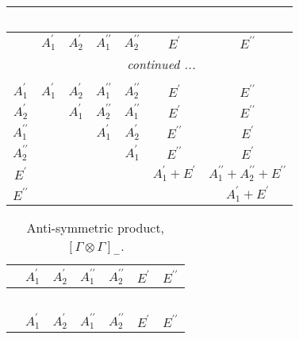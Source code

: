 \documentclass[fleqn,10pt,landscape]{article}
\begin{document}
\begin{itemize}
\begin{center}
\begin{longtable}{c|cccccc}
\multicolumn{6}{l}{\tablename\ \thetable{}} \\
 \hline \hline
 & $ A_{1}^{\prime} $ & $ A_{2}^{\prime} $ & $ A_{1}^{\prime\prime} $ & $ A_{2}^{\prime\prime} $ & $ E^{\prime} $ & $ E^{\prime\prime} $ \\ \hline \endhead

 \hline \hline
\multicolumn{6}{r}{\footnotesize\it continued ...} \\ \endfoot

 \hline \hline
\multicolumn{6}{r}{} \\ \endlastfoot

$ A_{1}^{\prime} $ & $ A_{1}^{\prime} $ & $ A_{2}^{\prime} $ & $ A_{1}^{\prime\prime} $ & $ A_{2}^{\prime\prime} $ & $ E^{\prime} $ & $ E^{\prime\prime} $ \\
$ A_{2}^{\prime} $ & $  $ & $ A_{1}^{\prime} $ & $ A_{2}^{\prime\prime} $ & $ A_{1}^{\prime\prime} $ & $ E^{\prime} $ & $ E^{\prime\prime} $ \\
$ A_{1}^{\prime\prime} $ & $  $ & $  $ & $ A_{1}^{\prime} $ & $ A_{2}^{\prime} $ & $ E^{\prime\prime} $ & $ E^{\prime} $ \\
$ A_{2}^{\prime\prime} $ & $  $ & $  $ & $  $ & $ A_{1}^{\prime} $ & $ E^{\prime\prime} $ & $ E^{\prime} $ \\
$ E^{\prime} $ & $  $ & $  $ & $  $ & $  $ & $ A_{1}^{\prime} + E^{\prime} $ & $ A_{1}^{\prime\prime} + A_{2}^{\prime\prime} + E^{\prime\prime} $ \\
$ E^{\prime\prime} $ & $  $ & $  $ & $  $ & $  $ & $  $ & $ A_{1}^{\prime} + E^{\prime} $ \\
\end{longtable}
\end{center}
\begin{center}
\renewcommand{\arraystretch}{1.0}
\begin{longtable}{ccccccc}
\caption{Anti-symmetric product, $[\Gamma\otimes\Gamma]_-$.}
 \\
 \hline \hline
 & $ A_{1}^{\prime} $ & $ A_{2}^{\prime} $ & $ A_{1}^{\prime\prime} $ & $ A_{2}^{\prime\prime} $ & $ E^{\prime} $ & $ E^{\prime\prime} $ \\ \hline \endfirsthead

\multicolumn{6}{l}{\tablename\ \thetable{}} \\
 \hline \hline
 & $ A_{1}^{\prime} $ & $ A_{2}^{\prime} $ & $ A_{1}^{\prime\prime} $ & $ A_{2}^{\prime\prime} $ & $ E^{\prime} $ & $ E^{\prime\prime} $ \\ \hline \endhead


\end{longtable}
\end{center}
\end{itemize}
\end{document}

